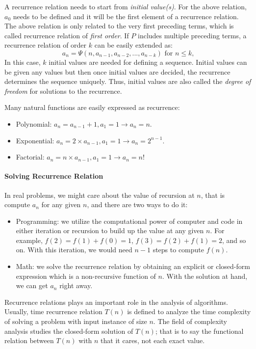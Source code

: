 \documentclass[../main.tex]{subfiles}
\begin{document}
A recurrence relation needs to start from \textit{initial value(s)}. For the above relation, $a_0$ needs to be defined and it will be the first element of a recurrence relation. The above relation is only related to the very first preceding terms, which is called recurrence relation of \textit{first order}. If $P$ includes multiple preceding terms, a recurrence relation of order $k$ can be easily extended as:
\begin{equation}
    a_n = \Psi(n, a_{n-1}, a_{n-2}, ..., a_{n-k})  \text{ for $n \leq k$,}
\end{equation}
In this case, $k$ initial values are needed for defining a sequence. Initial values can be given any values but then once initial values are decided,  the recurrence determines the sequence uniquely. Thus, initial values are also called the \textit{degree of freedom} for solutions to the recurrence. 

Many natural functions are easily expressed as recurrence:
\begin{itemize}
    \item Polynomial: $a_n = a_{n-1}+1, a_1=1 \xrightarrow{} a_n = n$.
    \item Exponential: $a_n = 2 \times a_{n-1}, a_1=1 \xrightarrow{} a_n = 2^{n-1}$.
    \item Factorial: $a_n = n\times a_{n-1}, a_1=1 \xrightarrow{}a_n = n!$
\end{itemize}

\paragraph{Solving Recurrence Relation} In real problems, we might care about the value of recursion at $n$, that is compute $a_n$ for any given $n$, and there are two ways to do it: 
\begin{itemize}
    \item Programming: we utilize the computational power of computer and code in either iteration or recursion to build up the value at any given $n$. For example, $f(2)=f(1)+f(0)=1$, $f(3)=f(2)+f(1)=2$, and so on. With this iteration, we would need $n-1$ steps to compute $f(n)$. 
    \item Math: we solve the recurrence relation by obtaining an explicit or closed-form expression which is a non-recursive function of $n$. With the solution at hand, we can get  $a_n$ right away.
\end{itemize}
 Recurrence relations plays an important role in the analysis of algorithms. Usually, time recurrence relation $T(n)$ is defined to analyze the time complexity of solving a problem with input instance of size $n$. The field of complexity analysis studies the closed-form solution of $T(n)$; that is to say the functional relation between $T(n)$ with $n$ that it cares, not each exact value. 
 
\end{document}
